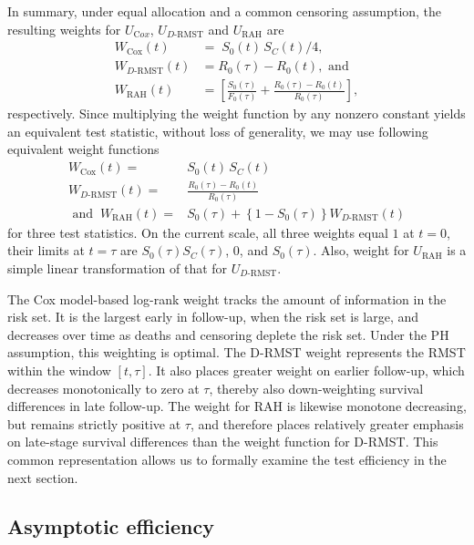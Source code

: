 \documentclass[12pt]{article}
\newcommand{\RAH}{\mathrm{RAH}}
\newcommand{\DRMST}{D\text{-}\mathrm{RMST}}
\begin{document}
\medskip
In summary, under equal allocation and a common censoring assumption, the
resulting weights for $U_{\mathrm Cox}$, $U_{\DRMST}$ and $U_{\RAH}$ are
\begin{align*}
  W_{\mathrm{Cox}}(t)
    &=\;S_0(t)\,S_C(t)/4,\\
  W_{\DRMST}(t)
    &= R_0(\tau)-R_0(t), \mbox{ and}\\
  W_{\RAH}(t)
    &= \left[\frac{S_0(\tau)}{F_0(\tau)}
              +\frac{ R_0(\tau)-R_0(t)}{R_0(\tau)}\right],
\end{align*}
respectively. Since multiplying the weight function by any nonzero constant yields an equivalent test statistic, without loss of generality, we may use following equivalent weight functions
\begin{align*}
  W_{\mathrm{Cox}}(t)=&S_0(t)\,S_C(t)\\
  W_{\DRMST}(t)=&\frac{ R_0(\tau)-R_0(t)}{R_0(\tau)}\\
  \mbox{ and }~
  W_{\RAH}(t)=&S_0(\tau)+\left\{1-S_0(\tau)\right\}W_{\DRMST}(t)
\end{align*}
for three test statistics.
On the current scale, all three weights equal $1$ at $t=0$, their limits at
$t=\tau$ are $S_0(\tau)S_C(\tau)$, $0$, and $S_0(\tau)$. Also, weight for $U_{\RAH}$ is a simple linear transformation of that for $U_{\DRMST}$.

The Cox model-based log-rank weight tracks the amount of information in the risk set. It is the largest early in follow-up, when the risk set is large, and decreases over time as deaths and censoring deplete the risk set. Under the PH assumption, this weighting is optimal. The D-RMST weight represents the RMST within the window \([t, \tau]\). It also places greater weight on earlier follow-up, which decreases monotonically to zero at \(\tau\), thereby also down-weighting survival differences in late follow-up. The weight for RAH is likewise monotone decreasing, but remains strictly positive at \(\tau\), and therefore places relatively greater emphasis on late-stage survival differences than the weight function for D-RMST. This common representation allows us to formally examine the test efficiency in the next section.





\subsection{Asymptotic efficiency}
\label{sec:efficiency}
\end{document}
